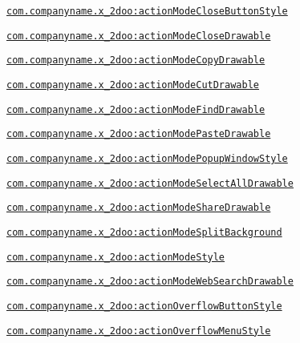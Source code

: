 {\tt \hyperlink{classandroid_1_1support_1_1v4_1_1_r_1_1styleable_cdb6ed50e0449f44c75352a5178b4674}{com.companyname.x\_\-2doo:actionModeCloseButtonStyle}}

{\tt \hyperlink{classandroid_1_1support_1_1v4_1_1_r_1_1styleable_b09f6cbf2975e5f044f4db1c3f5be82e}{com.companyname.x\_\-2doo:actionModeCloseDrawable}}

{\tt \hyperlink{classandroid_1_1support_1_1v4_1_1_r_1_1styleable_6efcfd6f29a1ed5f1e115d527ad02db2}{com.companyname.x\_\-2doo:actionModeCopyDrawable}}

{\tt \hyperlink{classandroid_1_1support_1_1v4_1_1_r_1_1styleable_ff9fdface004857501db9de7aedb1dd6}{com.companyname.x\_\-2doo:actionModeCutDrawable}}

{\tt \hyperlink{classandroid_1_1support_1_1v4_1_1_r_1_1styleable_4c89f9a8ad7b10afd63ffd919b6c656d}{com.companyname.x\_\-2doo:actionModeFindDrawable}}

{\tt \hyperlink{classandroid_1_1support_1_1v4_1_1_r_1_1styleable_ce113ab232516420cf074243bfe9453f}{com.companyname.x\_\-2doo:actionModePasteDrawable}}

{\tt \hyperlink{classandroid_1_1support_1_1v4_1_1_r_1_1styleable_bcdd14cc5abf52a599a9a9d79cd848bd}{com.companyname.x\_\-2doo:actionModePopupWindowStyle}}

{\tt \hyperlink{classandroid_1_1support_1_1v4_1_1_r_1_1styleable_161a3ac1577d6c574603d52de21d3d13}{com.companyname.x\_\-2doo:actionModeSelectAllDrawable}}

{\tt \hyperlink{classandroid_1_1support_1_1v4_1_1_r_1_1styleable_5d3af33e63914f57419c77e882cafd0c}{com.companyname.x\_\-2doo:actionModeShareDrawable}}

{\tt \hyperlink{classandroid_1_1support_1_1v4_1_1_r_1_1styleable_5e9c280564e789966ff3d14b724504a1}{com.companyname.x\_\-2doo:actionModeSplitBackground}}

{\tt \hyperlink{classandroid_1_1support_1_1v4_1_1_r_1_1styleable_7b9d118860f9039d760ed5c14bc0d23c}{com.companyname.x\_\-2doo:actionModeStyle}}

{\tt \hyperlink{classandroid_1_1support_1_1v4_1_1_r_1_1styleable_bfa14a297ea509f8f84881a8e67711b1}{com.companyname.x\_\-2doo:actionModeWebSearchDrawable}}

{\tt \hyperlink{classandroid_1_1support_1_1v4_1_1_r_1_1styleable_37abdbb58ba6784cee7b4db7074bb2d4}{com.companyname.x\_\-2doo:actionOverflowButtonStyle}}

{\tt \hyperlink{classandroid_1_1support_1_1v4_1_1_r_1_1styleable_a866c80182ecc37a2b36bd4b28132297}{com.companyname.x\_\-2doo:actionOverflowMenuStyle}}

